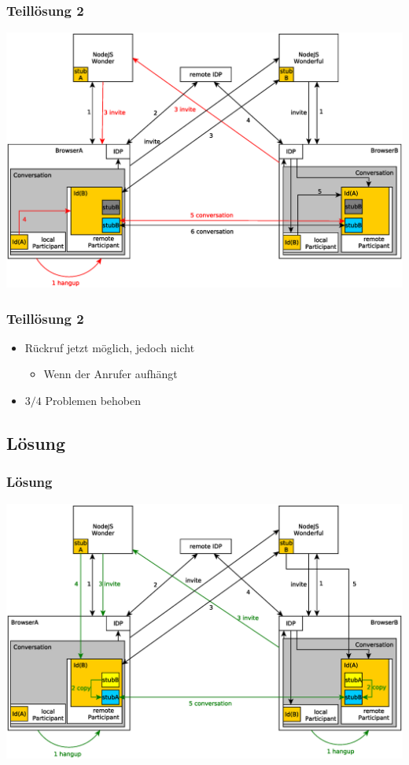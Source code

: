 \documentclass{beamer}
\begin{document}
\begin{frame}
	\frametitle{Teillösung 2}
	\includegraphics[scale=0.365,centered]{pictures/bye_ah_ba} %
\end{frame}

\begin{frame}
	\frametitle{Teillösung 2}
	\begin{itemize}
		\item Rückruf jetzt möglich, jedoch nicht
		\begin{itemize}
			\item Wenn der Anrufer aufhängt
		\end{itemize}
		\item $3/4$ Problemen behoben
	\end{itemize}
\end{frame}


\subsection{Lösung}
\begin{frame}
	\frametitle{Lösung}
	\includegraphics[scale=0.365,centered]{pictures/fix_komplett}
\end{frame}
\end{document}
